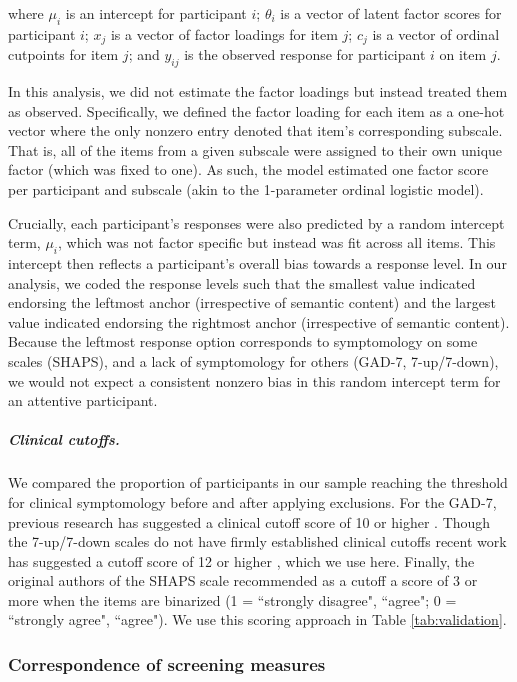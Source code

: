 \documentclass[a4paper,notitlepage,12pt]{article}
\begin{document}
\begin{refsection}[main]
where $\mu_i$ is an intercept for participant $i$; $\theta_i$ is a vector of latent factor scores for participant $i$; $x_j$ is a vector of factor loadings for item $j$; $c_j$ is a vector of ordinal cutpoints for item $j$; and $y_{ij}$ is the observed response for participant $i$ on item $j$.

In this analysis, we did not estimate the factor loadings but instead treated them as observed. Specifically, we defined the factor loading for each item as a one-hot vector where the only nonzero entry denoted that item's corresponding subscale. That is, all of the items from a given subscale were assigned to their own unique factor (which was fixed to one). As such, the model estimated one factor score per participant and subscale (akin to the 1-parameter ordinal logistic model).

Crucially, each participant's responses were also predicted by a random intercept term, $\mu_i$, which was not factor specific but instead was fit across all items. This intercept then reflects a participant's overall bias towards a response level. In our analysis, we coded the response levels such that the smallest value indicated endorsing the leftmost anchor (irrespective of semantic content) and the largest value indicated endorsing the rightmost anchor (irrespective of semantic content). Because the leftmost response option corresponds to symptomology on some scales (SHAPS), and a lack of symptomology for others (GAD-7, 7-up/7-down), we would not expect a consistent nonzero bias in this random intercept term for an attentive participant. 

\subparagraph{Clinical cutoffs.} We compared the proportion of participants in our sample reaching the threshold for clinical symptomology before and after applying exclusions. For the GAD-7, previous research has suggested a clinical cutoff score of 10 or higher \cite{lowe2008validation, hinz2017psychometric}. Though the 7-up/7-down scales do not have firmly established clinical cutoffs recent work has suggested a cutoff score of 12 or higher \cite{youngstrom2020evaluating}, which we use here. Finally, the original authors of the SHAPS scale recommended as a cutoff a score of 3 or more when the items are binarized (1 = ``strongly disagree", ``agree"; 0 = ``strongly agree", ``agree"). We use this scoring approach in Table \ref{tab:validation}.   

\subsubsection{Correspondence of screening measures}


\end{refsection}
\end{document}
